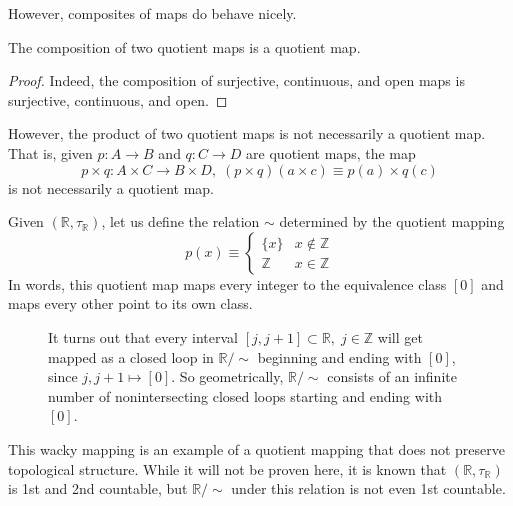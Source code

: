    However, composites of maps do behave nicely. 

    \begin{proposition}
      The composition of two quotient maps is a quotient map. 
    \end{proposition}
    \begin{proof}
      Indeed, the composition of surjective, continuous, and open maps is surjective, continuous, and open. 
    \end{proof}

    However, the product of two quotient maps is not necessarily a quotient map. That is, given $p: A \rightarrow B$ and $q: C \rightarrow D$ are quotient maps, the map 
    \begin{equation}
      p \times q: A \times C \rightarrow B \times D, \; (p \times q) (a \times c) \equiv p(a) \times q(c)
    \end{equation}
    is not necessarily a quotient map. 

    \begin{example}
      Given $(\mathbb{R}, \tau_{\mathbb{R}})$, let us define the relation $\sim$ determined by the quotient mapping 
      \begin{equation}
        p(x) \equiv \begin{cases} \{x\} & x \not\in \mathbb{Z} \\ \mathbb{Z} & x \in \mathbb{Z} \end{cases}
      \end{equation}
      In words, this quotient map maps every integer to the equivalence class $[0]$ and maps every other point to its own class. 

      \begin{figure}[H]
        \centering 
        \caption{It turns out that every interval $[j, j+1] \subset \mathbb{R}, \; j \in \mathbb{Z}$ will get mapped as a closed loop in $\mathbb{R} / \sim$ beginning and ending with $[0]$, since $j, j+1 \mapsto [0]$. So geometrically, $\mathbb{R} / \sim$ consists of an infinite number of nonintersecting closed loops starting and ending with $[0]$. }
        \label{fig:integer}
      \end{figure}

      This wacky mapping is an example of a quotient mapping that does not preserve topological structure. While it will not be proven here, it is known that $(\mathbb{R}, \tau_{\mathbb{R}})$ is 1st and 2nd countable, but $\mathbb{R} / \sim$ under this relation is not even 1st countable. 
    \end{example}

